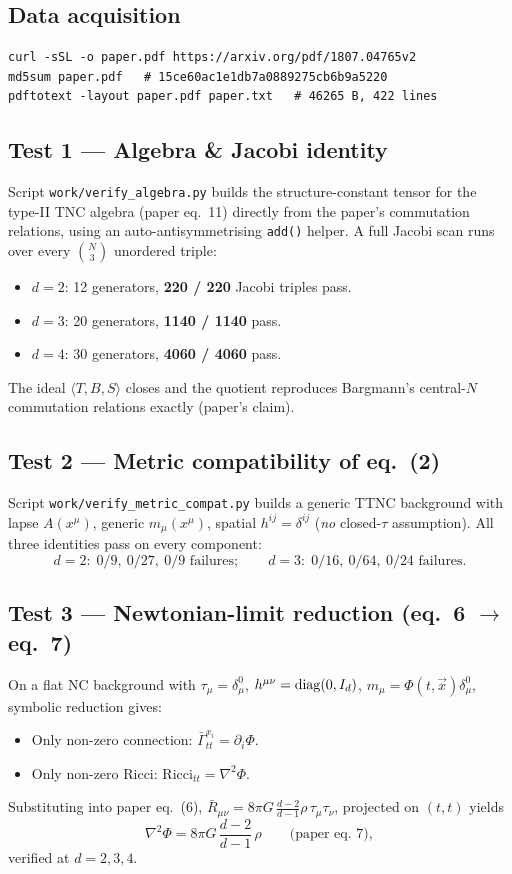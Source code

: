 \documentclass[11pt]{article}
\begin{document}
\subsection{Data acquisition}
\begin{lstlisting}[basicstyle=\ttfamily\small]
curl -sSL -o paper.pdf https://arxiv.org/pdf/1807.04765v2
md5sum paper.pdf   # 15ce60ac1e1db7a0889275cb6b9a5220
pdftotext -layout paper.pdf paper.txt   # 46265 B, 422 lines
\end{lstlisting}

\subsection{Test 1 --- Algebra \& Jacobi identity}
Script \texttt{work/verify\_algebra.py} builds the structure-constant tensor for
the type-II TNC algebra (paper eq.~11) directly from the paper's commutation
relations, using an auto-antisymmetrising \texttt{add()} helper. A full Jacobi
scan runs over every $\binom{N}{3}$ unordered triple:
\begin{itemize}
  \item $d=2$: 12 generators, {\bf 220 / 220} Jacobi triples pass.
  \item $d=3$: 20 generators, {\bf 1140 / 1140} pass.
  \item $d=4$: 30 generators, {\bf 4060 / 4060} pass.
\end{itemize}
The ideal $\langle T,B,S\rangle$ closes and the quotient reproduces Bargmann's
central-$N$ commutation relations exactly (paper's claim).

\subsection{Test 2 --- Metric compatibility of eq.~(2)}
Script \texttt{work/verify\_metric\_compat.py} builds a generic TTNC background
with lapse $A(x^\mu)$, generic $m_\mu(x^\mu)$, spatial $h^{ij}=\delta^{ij}$
(\emph{no} closed-$\tau$ assumption). All three identities pass on every
component:
\[
d=2:\; 0/9,\ 0/27,\ 0/9 \text{ failures};\qquad
d=3:\; 0/16,\ 0/64,\ 0/24 \text{ failures}.
\]

\subsection{Test 3 --- Newtonian-limit reduction (eq.~6 $\to$ eq.~7)}
On a flat NC background with $\tau_\mu=\delta_\mu^0$, $h^{\mu\nu}={\rm diag}(0,I_d)$,
$m_\mu=\Phi(t,\vec x)\delta_\mu^0$, symbolic reduction gives:
\begin{itemize}
  \item Only non-zero connection: $\bar\Gamma^{x_i}_{tt}=\partial_i\Phi$.
  \item Only non-zero Ricci: $\mathrm{Ricci}_{tt}=\nabla^2\Phi$.
\end{itemize}
Substituting into paper eq.~(6), $\bar R_{\mu\nu}=8\pi G\,\tfrac{d-2}{d-1}\rho\,
\tau_\mu\tau_\nu$, projected on $(t,t)$ yields
\[
\nabla^2\Phi = 8\pi G\,\frac{d-2}{d-1}\,\rho \qquad\text{(paper eq.~7)},
\]
verified at $d=2,3,4$.
\end{document}
